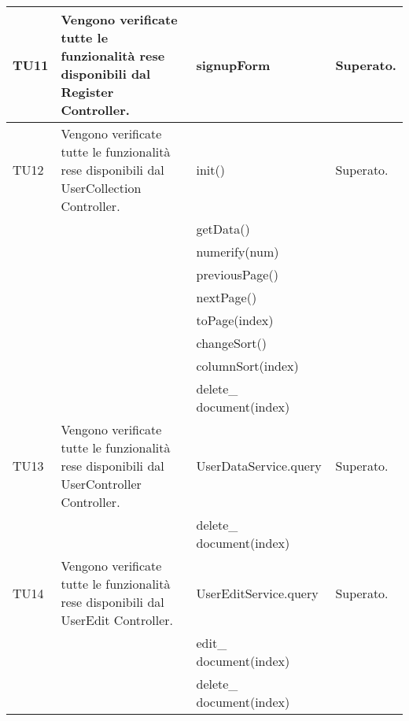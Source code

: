 \begin{center}
\begin{longtable}{|p{1cm}|p{4cm}|p{6cm}|p{2cm}|}
\midrule
TU11
& Vengono verificate tutte le funzionalità rese disponibili dal Register Controller.
& signupForm
& Superato.\\


\midrule
TU12
& Vengono verificate tutte le funzionalità rese disponibili dal UserCollection Controller.
& init()
& Superato.\\
& & getData() &\\
& & numerify(num) &\\
& & previousPage() &\\
& & nextPage() &\\
& & toPage(index) &\\
& & changeSort() &\\
& & columnSort(index) &\\
& & delete\_ document(index) &\\


\midrule
TU13
& Vengono verificate tutte le funzionalità rese disponibili dal UserController Controller.
& UserDataService.query
& Superato.\\
& & delete\_ document(index) &\\



\midrule
TU14
& Vengono verificate tutte le funzionalità rese disponibili dal UserEdit Controller.
& UserEditService.query
& Superato.\\
& & edit\_ document(index) &\\
& & delete\_ document(index) &\\





\end{longtable}
\end{center}


